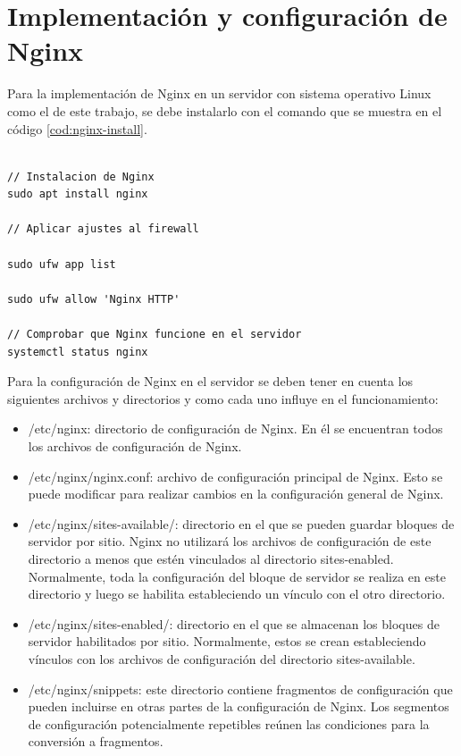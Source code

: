 \section{Implementación y configuración de Nginx}

Para la implementación de Nginx en un servidor con sistema operativo Linux como el de este trabajo,  se debe instalarlo con el comando que se muestra en el código \ref{cod:nginx-install}. 

\begin{lstlisting}[label=cod:nginx-install,caption=Instalación de Nginx en servidor con sistema operativo Linux.] 

// Instalacion de Nginx
sudo apt install nginx

// Aplicar ajustes al firewall

sudo ufw app list

sudo ufw allow 'Nginx HTTP'

// Comprobar que Nginx funcione en el servidor
systemctl status nginx

\end{lstlisting} 

Para la configuración de Nginx en el servidor se deben tener en cuenta los siguientes archivos y directorios y como cada uno influye en el funcionamiento:

\begin{itemize}
	\item /etc/nginx: directorio de configuración de Nginx. En él se encuentran todos los archivos de configuración de Nginx.
	
	\item /etc/nginx/nginx.conf: archivo de configuración principal de Nginx. Esto se puede modificar para realizar cambios en la configuración general de Nginx.
	
	\item /etc/nginx/sites-available/: directorio en el que se pueden guardar bloques de servidor por sitio. Nginx no utilizará los archivos de configuración de este directorio a menos que estén vinculados al directorio sites-enabled. Normalmente, toda la configuración del bloque de servidor se realiza en este directorio y luego se habilita estableciendo un vínculo con el otro directorio.
	
	\item /etc/nginx/sites-enabled/: directorio en el que se almacenan los bloques de servidor habilitados por sitio. Normalmente, estos se crean estableciendo vínculos con los archivos de configuración del directorio sites-available.

	\item /etc/nginx/snippets: este directorio contiene fragmentos de configuración que pueden incluirse en otras partes de la configuración de Nginx. Los segmentos de configuración potencialmente repetibles reúnen las condiciones para la conversión a fragmentos.
\end{itemize}

